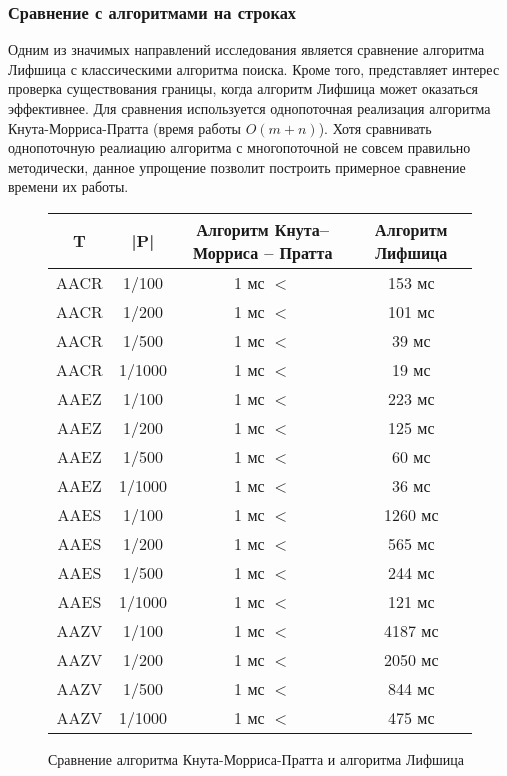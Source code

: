 \documentclass[14pt]{article}
\begin{document}
\subsubsection{Сравнение с алгоритмами на строках}
Одним из значимых направлений исследования является сравнение алгоритма Лифшица с классическими алгоритма поиска. Кроме того, представляет интерес проверка существования границы, когда алгоритм Лифшица может оказаться эффективнее. Для сравнения используется однопоточная реализация алгоритма Кнута-Морриса-Пратта (время работы $O(m + n)$). Хотя сравнивать однопоточную реалиацию алгоритма с многопоточной не совсем правильно методически, данное упрощение позволит построить примерное сравнение времени их работы.
\begin{figure}
	\begin{center}
	\begin{tabular}{ | c | c | c | c |}
        \hline T  & |P| & Алгоритм Кнута-- Морриса  -- Пратта & Алгоритм Лифшица\\
        \hline AACR & 1/100 & 1 мс $<$ & 153 мс\\
        \hline AACR & 1/200 & 1 мс $<$& 101 мс\\
        \hline AACR & 1/500 & 1 мс $<$& 39 мс\\
 		\hline AACR & 1/1000 & 1 мс $<$& 19 мс\\
              
        \hline AAEZ & 1/100 & 1 мс $<$ & 223 мс\\
        \hline AAEZ & 1/200 & 1 мс $<$ & 125 мс\\
        \hline AAEZ & 1/500 & 1 мс $<$ & 60 мс\\
        \hline AAEZ & 1/1000 & 1 мс $<$ & 36 мс\\
        
  		\hline AAES & 1/100 & 1 мс $<$ & 1260  мс\\
        \hline AAES & 1/200 & 1 мс $<$ & 565  мс\\
        \hline AAES & 1/500 & 1 мс $<$ & 244  мс\\
        \hline AAES & 1/1000 & 1 мс $<$ & 121  мс\\
     
  		\hline AAZV & 1/100 & 1 мс $<$ & 4187  мс \\
        \hline AAZV & 1/200 & 1 мс $<$ & 2050  мс \\
        \hline AAZV & 1/500 & 1 мс $<$ & 844  мс \\
        \hline AAZV & 1/1000 & 1 мс $<$ & 475  мс \\
     
		\hline
    \end{tabular}
        \end{center}


    \caption{Сравнение алгоритма Кнута-Морриса-Пратта и алгоритма Лифшица}
    \label{typical_research}
\end{figure}
\end{document}
